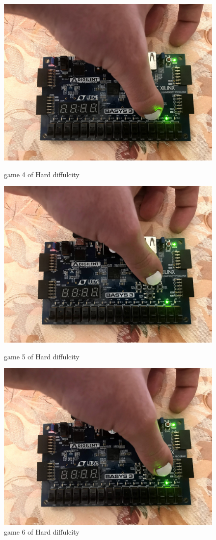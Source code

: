 \documentclass[11pt]{article}
\begin{document}
\begin{figure}[ht]
	\includegraphics{IMG_1304.JPG}
	\caption{game 4 of Hard diffulcity }
	\label{fig:sim_with_table}
	
	\includegraphics{IMG_1305.JPG}
	\caption{game 5 of Hard diffulcity }
	\label{fig:sim_with_table}
	
	\includegraphics{IMG_1306.JPG}
	\caption{game 6 of Hard diffulcity }
	\label{fig:sim_with_table}
	

\end{figure}
\end{document}
